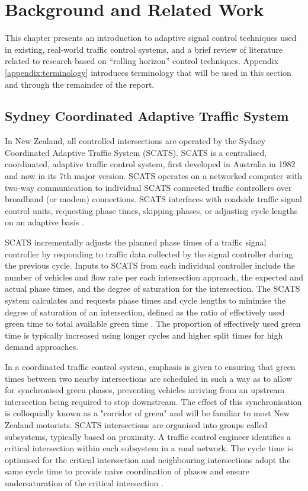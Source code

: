 \chapter{Background and Related Work}

This chapter presents an introduction to adaptive signal control techniques used in existing, real-world traffic control systems, and a brief review of literature related to research based on ``rolling horizon'' control techniques. Appendix \ref{appendix:terminology} introduces terminology that will be used in this section and through the remainder of the report. 

\section{Sydney Coordinated Adaptive Traffic System}

In New Zealand, all controlled intersections are operated by the Sydney Coordinated Adaptive Traffic System (SCATS). SCATS is a centralised, coordinated, adaptive traffic control system, first developed in Australia in 1982 and now in its 7th major version. SCATS operates on a networked computer with two-way communication to individual SCATS connected traffic controllers over broadband (or modem) connections. SCATS interfaces with roadside traffic signal control units, requesting phase times, skipping phases, or adjusting cycle lengths on an adaptive basis \cite{lowrie1982scats}.

SCATS incrementally adjusts the planned phase times of a traffic signal controller by responding to traffic data collected by the signal controller during the previous cycle. Inputs to SCATS from each individual controller include the number of vehicles and flow rate per each intersection approach, the expected and actual phase times, and the degree of saturation for the intersection.  The SCATS system calculates and requests phase times and cycle lengths to minimise the degree of saturation of an intersection, defined as the ratio of effectively used green time to total available green time \cite{wolshon1999scats}. The proportion of effectively used green time is typically increased using longer cycles and higher split times for high demand approaches. 

In a coordinated traffic control system, emphasis is given to ensuring that green times between two nearby intersections are scheduled in such a way as to allow for synchronised green phases, preventing vehicles arriving from an upstream intersection being required to stop downstream. The effect of this synchronisation is colloquially known as a "corridor of green" and will be familiar to most New Zealand motorists. SCATS intersections are organised into groups called subsystems, typically based on proximity. A traffic control engineer identifies a critical intersection within each subsystem in a road network. The cycle time is optimised for the critical intersection and neighbouring intersections adopt the same cycle time to provide naive coordination of phases and ensure undersaturation of the critical intersection \cite{kilby2010rta}.

